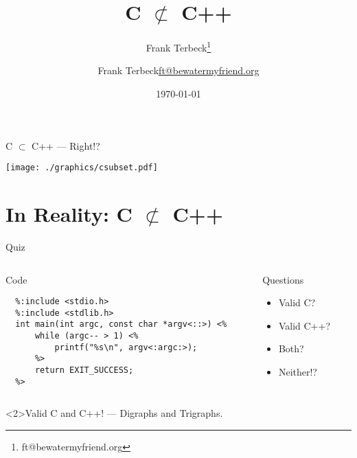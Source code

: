 \documentclass[presentation,aspectratio=169]{beamer}
\author{Frank Terbeck\thanks{ft@bewatermyfriend.org}}
\date{\today}
\title{C \(\not\subset\) C++}
\author{\texorpdfstring{Frank Terbeck\newline\tiny{\url{ft@bewatermyfriend.org}}}{Frank Terbeck}}
\begin{document}
\maketitle

\begin{frame}[label={sec:org2cd0672}]{C \(\subset\) C++ — Right!?}
\begin{center}
\texttt{[image: ./graphics/csubset.pdf]}
\end{center}
\end{frame}

\section{In Reality: C \(\not\subset\) C++}
\label{sec:orgf0e5bbb}


\begin{frame}[fragile,label={sec:org23c4234}]{Quiz}
\begin{columns}
\begin{column}{0.68\columnwidth}
\begin{block}{Code}
\begin{verbatim}
  %:include <stdio.h>
  %:include <stdlib.h>
  int main(int argc, const char *argv<::>) <%
      while (argc-- > 1) <%
          printf("%s\n", argv<:argc:>);
      %>
      return EXIT_SUCCESS;
  %>
\end{verbatim}
\end{block}
\end{column}

\begin{column}{0.38\columnwidth}
\begin{block}{Questions}
\begin{itemize}
\item Valid C?
\item Valid C++?
\item Both?
\item Neither!?
\end{itemize}
\end{block}
\end{column}
\end{columns}

\begin{block}<2>{Valid C and C++! — Digraphs and Trigraphs.}
\end{block}
\end{frame}
\end{document}
